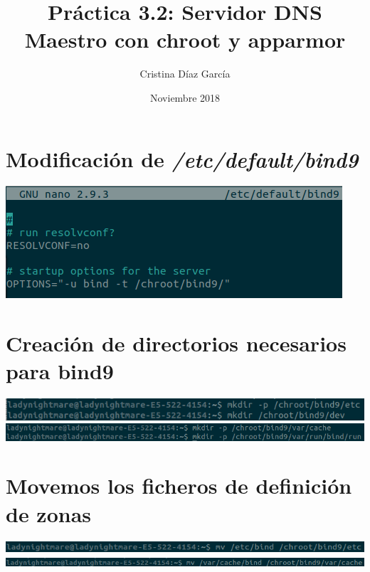 \documentclass{article}
\title{Práctica 3.2: Servidor DNS Maestro con chroot y apparmor}
\author{Cristina Díaz García}
\date{Noviembre 2018}
\begin{document}

\begin{titlingpage}
\maketitle
\end{titlingpage}

\newpage

\tableofcontents

\newpage

\section{Modificación de \textit{/etc/default/bind9}}

\begin{center}
	\includegraphics[scale=0.5]{Bind9.png} 
\end{center}

\section{Creación de directorios necesarios para bind9}

\begin{center}
	\includegraphics[scale=0.5]{mkdir1.png}
	\includegraphics[scale=0.5]{mkdir2.png} 
\end{center}

\section{Movemos los ficheros de definición de zonas}

\begin{center}
	\includegraphics[scale=0.5]{mv1.png}
	\includegraphics[scale=0.5]{mv2.png} 
\end{center}
\end{document}
